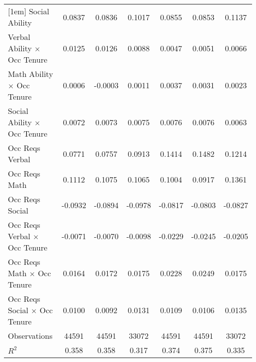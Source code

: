 {\begin{tabular}{l*{6}{c}}
[1em]
Social Ability      &      0.0837\sym{***}&      0.0836\sym{***}&      0.1017\sym{***}&      0.0855\sym{***}&      0.0853\sym{***}&      0.1137\sym{***}\\
[1em]
Verbal Ability $\times$ Occ Tenure&      0.0125\sym{***}&      0.0126\sym{***}&      0.0088\sym{**} &      0.0047\sym{*}  &      0.0051\sym{**} &      0.0066\sym{**} \\
[1em]
Math Ability $\times$ Occ Tenure&      0.0006         &     -0.0003         &      0.0011         &      0.0037         &      0.0031         &      0.0023         \\
[1em]
Social Ability $\times$ Occ Tenure&      0.0072\sym{***}&      0.0073\sym{***}&      0.0075\sym{***}&      0.0076\sym{***}&      0.0076\sym{***}&      0.0063\sym{***}\\
[1em]
Occ Reqs Verbal     &      0.0771         &      0.0757         &      0.0913         &      0.1414\sym{**} &      0.1482\sym{**} &      0.1214\sym{*}  \\
[1em]
Occ Reqs Math       &      0.1112\sym{*}  &      0.1075\sym{*}  &      0.1065         &      0.1004\sym{*}  &      0.0917\sym{*}  &      0.1361\sym{**} \\
[1em]
Occ Reqs Social     &     -0.0932\sym{***}&     -0.0894\sym{***}&     -0.0978\sym{***}&     -0.0817\sym{***}&     -0.0803\sym{***}&     -0.0827\sym{***}\\
[1em]
Occ Reqs Verbal $\times$ Occ Tenure&     -0.0071         &     -0.0070         &     -0.0098         &     -0.0229\sym{***}&     -0.0245\sym{***}&     -0.0205\sym{**} \\
[1em]
Occ Reqs Math $\times$ Occ Tenure&      0.0164\sym{*}  &      0.0172\sym{**} &      0.0175\sym{*}  &      0.0228\sym{***}&      0.0249\sym{***}&      0.0175\sym{**} \\
[1em]
Occ Reqs Social $\times$ Occ Tenure&      0.0100\sym{***}&      0.0092\sym{***}&      0.0131\sym{***}&      0.0109\sym{***}&      0.0106\sym{***}&      0.0135\sym{***}\\
\hline  
Observations        &       44591         &       44591         &       33072         &       44591         &       44591         &       33072         \\
\(R^{2}\)           &       0.358         &       0.358         &       0.317         &       0.374         &       0.375         &       0.335         \\
\hline  
\end{tabular}
}
